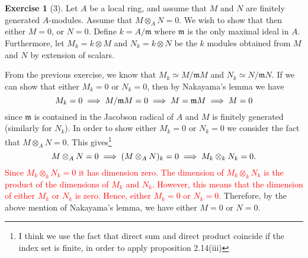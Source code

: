 \documentclass{article}
\theoremstyle{definition}
\newtheorem*{exercise}{Exercise}
\begin{document}
\begin{exercise}[3]
    Let $A$ be a local ring, and assume that $M$ and $N$ are finitely generated
    $A$-modules. Assume that $M \otimes_A N = 0$. We wish to show that then
    either $M = 0$, or $N = 0$. Define $k = A / \mathfrak{m}$ where
    $\mathfrak{m}$ is the only maximal ideal in $A$. Furthermore, let $M_k = k
    \otimes M$ and $N_k = k \otimes N$ be the $k$ modules obtained from $M$ and
    $N$ by extension of scalars.

    From the previous exercise, we know that $M_k \simeq M / \mathfrak{m}M$ and
    $N_k \simeq N / \mathfrak{m}N$. If we can show that either $M_k = 0$ or
    $N_k = 0$, then by Nakayama's lemma we have
    \begin{equation}
        \notag
        M_k = 0 \implies M / \mathfrak{m}M = 0 \implies M = \mathfrak{m}M
        \implies M = 0
    \end{equation}
    since $\mathfrak{m}$ is contained in the Jacobson radical of $A$ and $M$ is
    finitely generated (similarly for $N_k$).  In order to show either $M_k =
    0$ or $N_k = 0$ we consider the fact that $M \otimes_A N = 0$. This
    gives\footnote{I think we use the fact that direct sum and direct product
    coincide if the index set is finite, in order to apply proposition
    2.14(iii)}
    \begin{equation}
        \notag
        M \otimes_A N = 0 \implies (M \otimes_A N)_k = 0 \implies M_k \otimes_k
        N_k = 0.
    \end{equation}
    \textcolor{red}{Since $M_k \otimes_k N_k = 0$ it has dimension zero. The
    dimension of $M_k \otimes_k N_k$ is the product of the dimensions of $M_k$
    and $N_k$. However, this means that the dimension of either $M_k$ or $N_k$
is zero. Hence, either $M_k = 0$ or $N_k = 0$.} Therefore, by the above mention
of Nakayama's lemma, we have either $M = 0$ or $N = 0$.
\end{exercise}
\end{document}
